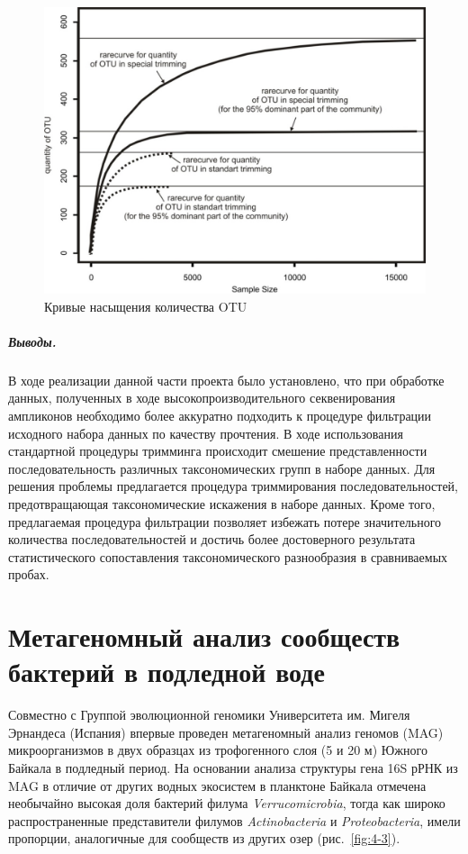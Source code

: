 \documentclass[a4paper,12pt,openany,final]{extreport}
\def\oldcaption{} \let\oldcaption=\caption
\def\caption{\stepcounter{captionsnum}\oldcaption}
\begin{document}
\begin{figure}\centering
\includegraphics[width=0.6\linewidth]{media/image7.jpeg}

\caption{Кривые насыщения количества OTU}\label{fig:3-1}
\end{figure}

\paragraph{Выводы.} В ходе реализации данной части проекта было
установлено, что при обработке данных, полученных в ходе
высокопроизводительного секвенирования ампликонов необходимо более
аккуратно подходить к процедуре фильтрации исходного набора данных по
качеству прочтения. В ходе использования стандартной процедуры тримминга
происходит смешение представленности последовательность различных
таксономических групп в наборе данных. Для решения проблемы предлагается
процедура триммирования последовательностей, предотвращающая
таксономические искажения в наборе данных. Кроме того, предлагаемая
процедура фильтрации позволяет избежать потере значительного количества
последовательностей и достичь более достоверного результата
статистического сопоставления таксономического разнообразия в
сравниваемых пробах.

\chapter{Метагеномный анализ сообществ бактерий в подледной воде} \label{chap:3}

Совместно с Группой эволюционной геномики Университета им. Мигеля
Эрнандеса (Испания) впервые проведен метагеномный анализ геномов (MAG)
микроорганизмов в двух образцах из трофогенного слоя (5 и 20 м) Южного
Байкала в подледный период. На основании анализа структуры гена 16S рРНК
из MAG в отличие от других водных экосистем в планктоне Байкала отмечена
необычайно высокая доля бактерий филума \emph{Verrucomicrobia}, тогда
как широко распространенные представители филумов \emph{Actinobacteria}
и \emph{Proteobacteria}, имели пропорции, аналогичные для сообществ из
других озер (рис.~\ref{fig:4-3}).
\end{document}
